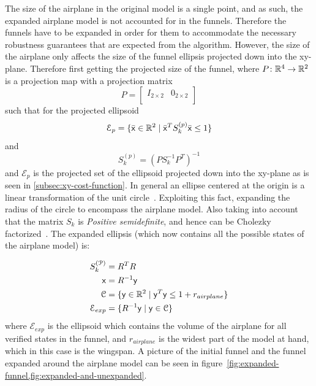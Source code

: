 The size of the airplane in the original model is a single point, and as such,
the expanded airplane model is not accounted for in the funnels. Therefore the
funnels have to be expanded in order for them to accommodate the necessary
robustness guarantees that are expected from the algorithm. However, the size of
the airplane only affects the size of the funnel ellipsis projected down into
the xy-plane. Therefore first getting the projected size of the funnel, where
\(P \colon \mathbb{R}^4 \rightarrow \mathbb{R}^2\) is a projection map with a projection matrix
\[
  P =
  \begin{bmatrix}
    I_{2 \times 2} & {0}_{2 \times 2} \\
  \end{bmatrix}
\]
such that for the projected ellipsoid
\[
  \mathcal{E}_{p} = \lbrace\bar{{\mathbf{\mathsf{x}}}} \in \mathbb{R}^{2} \mid
    {\bar{{\mathbf{\mathsf{x}}}}}^{T}S_{k}^{(p)}\bar{{\mathbf{\mathsf{x}}}} \leq 1\rbrace
\]
and
\[
  S_{k}^{(p)} = {\left( PS_{k}^{-1}P^T \right)}^{-1}
\]
and \(\mathcal{E}_{p}\) is the projected set of the ellipsoid projected down
into the xy-plane as is seen in \cref{subsec:xy-cost-function}. In general an
ellipse centered at the origin is a linear transformation of the unit
circle~\cite{lay2005linear}. Exploiting this fact, expanding the radius of the
circle to encompass the airplane model. Also taking into account that the matrix
\(S_{k}\) is \textit{Positive semidefinite}, and hence can be Cholezky
factorized~\cite{lay2005linear}. The expanded ellipsis (which now contains all
the possible states of the airplane model) is:

\begin{align*}
  S_{k}^{(\mathcal{P})} &= R^{T}R \\
  {\mathbf{\mathsf{x}}} &= R^{-1}{\mathbf{\mathsf{y}}} \\
  \mathcal{C} &= \lbrace{\mathbf{\mathsf{y}}} \in \mathbb{R}^2 \mid {\mathbf{\mathsf{y}}}^{T}{\mathbf{\mathsf{y}}} \leq 1 + r_{airplane}\rbrace \\
  \mathcal{E}_{exp} &= \lbrace R^{-1}{\mathbf{\mathsf{y}}} \mid {\mathbf{\mathsf{y}}} \in \mathcal{C}\rbrace \\
\end{align*}
where \(\mathcal{E}_{exp}\) is the ellipsoid which contains the volume of the
airplane for all verified states in the funnel, and \(r_{airplane}\) is the
widest part of the model at hand, which in this case is the wingspan. A picture
of the initial funnel and the funnel expanded around the airplane model can be
seen in figure~\cref{fig:expanded-funnel,fig:expanded-and-unexpanded}.

